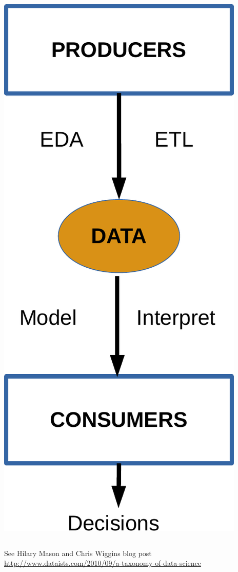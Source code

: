\documentclass[table,dvipsnames]{beamer}
\begin{document}
{\begin{columns}
\begin{column}{5cm}
\begin{center}
\includegraphics[scale=0.3]{data-decisions.pdf}
\end{center}
\end{column}
\end{columns}


\tiny
\begin{flushleft}
See Hilary Mason and Chris Wiggins blog post \\
\href{http://www.dataists.com/2010/09/a-taxonomy-of-data-science}{http://www.dataists.com/2010/09/a-taxonomy-of-data-science}
\end{flushleft}
}
\end{document}
